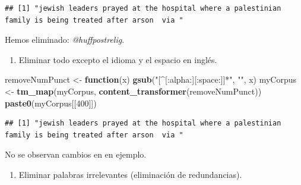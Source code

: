 \documentclass[
]{article}
\newenvironment{Shaded}{\begin{snugshade}}{\end{snugshade}}
\newcommand{\ControlFlowTok}[1]{\textcolor[rgb]{0.13,0.29,0.53}{\textbf{#1}}}
\newcommand{\DecValTok}[1]{\textcolor[rgb]{0.00,0.00,0.81}{#1}}
\newcommand{\KeywordTok}[1]{\textcolor[rgb]{0.13,0.29,0.53}{\textbf{#1}}}
\newcommand{\NormalTok}[1]{#1}
\newcommand{\StringTok}[1]{\textcolor[rgb]{0.31,0.60,0.02}{#1}}
\providecommand{\tightlist}{%
  \setlength{\itemsep}{0pt}\setlength{\parskip}{0pt}}
\begin{document}
\begin{verbatim}
## [1] "jewish leaders prayed at the hospital where a palestinian family is being treated after arson  via "
\end{verbatim}

Hemos eliminado: \emph{@huffpostrelig}.

\begin{enumerate}
\def\labelenumi{\arabic{enumi}.}
\setcounter{enumi}{3}
\tightlist
\item
  Eliminar todo excepto el idioma y el espacio en inglés.
\end{enumerate}

\begin{Shaded}
\begin{Highlighting}[]
\NormalTok{removeNumPunct <-}\StringTok{ }\ControlFlowTok{function}\NormalTok{(x) }\KeywordTok{gsub}\NormalTok{(}\StringTok{"[^[:alpha:][:space:]]*"}\NormalTok{, }\StringTok{""}\NormalTok{, x)   }
\NormalTok{myCorpus <-}\StringTok{ }\KeywordTok{tm_map}\NormalTok{(myCorpus, }\KeywordTok{content_transformer}\NormalTok{(removeNumPunct))}
\KeywordTok{paste0}\NormalTok{(myCorpus[[}\DecValTok{400}\NormalTok{]])}
\end{Highlighting}
\end{Shaded}

\begin{verbatim}
## [1] "jewish leaders prayed at the hospital where a palestinian family is being treated after arson  via "
\end{verbatim}

No se observan cambios en en ejemplo.

\begin{enumerate}
\def\labelenumi{\arabic{enumi}.}
\setcounter{enumi}{4}
\tightlist
\item
  Eliminar palabras irrelevantes (eliminación de redundancias).
\end{enumerate}
\end{document}
